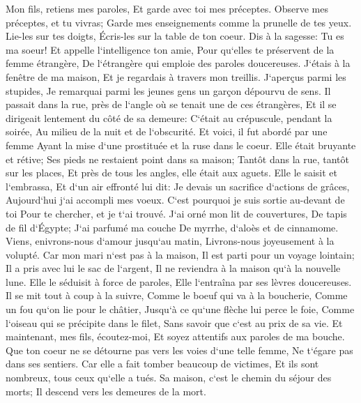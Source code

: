 \verse Mon fils, retiens mes paroles, Et garde avec toi mes préceptes. 
\verse Observe mes préceptes, et tu vivras; Garde mes enseignements comme la prunelle de tes yeux. 
\verse Lie-les sur tes doigts, Écris-les sur la table de ton coeur. 
\verse Dis à la sagesse: Tu es ma soeur! Et appelle l`intelligence ton amie, 
\verse Pour qu`elles te préservent de la femme étrangère, De l`étrangère qui emploie des paroles doucereuses. 
\verse J`étais à la fenêtre de ma maison, Et je regardais à travers mon treillis. 
\verse J`aperçus parmi les stupides, Je remarquai parmi les jeunes gens un garçon dépourvu de sens. 
\verse Il passait dans la rue, près de l`angle où se tenait une de ces étrangères, Et il se dirigeait lentement du côté de sa demeure: 
\verse C`était au crépuscule, pendant la soirée, Au milieu de la nuit et de l`obscurité. 
\verse Et voici, il fut abordé par une femme Ayant la mise d`une prostituée et la ruse dans le coeur. 
\verse Elle était bruyante et rétive; Ses pieds ne restaient point dans sa maison; 
\verse Tantôt dans la rue, tantôt sur les places, Et près de tous les angles, elle était aux aguets. 
\verse Elle le saisit et l`embrassa, Et d`un air effronté lui dit: 
\verse Je devais un sacrifice d`actions de grâces, Aujourd`hui j`ai accompli mes voeux. 
\verse C`est pourquoi je suis sortie au-devant de toi Pour te chercher, et je t`ai trouvé. 
\verse J`ai orné mon lit de couvertures, De tapis de fil d`Égypte; 
\verse J`ai parfumé ma couche De myrrhe, d`aloès et de cinnamome. 
\verse Viens, enivrons-nous d`amour jusqu`au matin, Livrons-nous joyeusement à la volupté. 
\verse Car mon mari n`est pas à la maison, Il est parti pour un voyage lointain; 
\verse Il a pris avec lui le sac de l`argent, Il ne reviendra à la maison qu`à la nouvelle lune. 
\verse Elle le séduisit à force de paroles, Elle l`entraîna par ses lèvres doucereuses. 
\verse Il se mit tout à coup à la suivre, Comme le boeuf qui va à la boucherie, Comme un fou qu`on lie pour le châtier, 
\verse Jusqu`à ce qu`une flèche lui perce le foie, Comme l`oiseau qui se précipite dans le filet, Sans savoir que c`est au prix de sa vie. 
\verse Et maintenant, mes fils, écoutez-moi, Et soyez attentifs aux paroles de ma bouche. 
\verse Que ton coeur ne se détourne pas vers les voies d`une telle femme, Ne t`égare pas dans ses sentiers. 
\verse Car elle a fait tomber beaucoup de victimes, Et ils sont nombreux, tous ceux qu`elle a tués. 
\verse Sa maison, c`est le chemin du séjour des morts; Il descend vers les demeures de la mort. 

